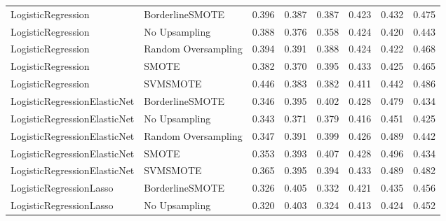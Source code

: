 \begin{tabular}{llllllll}
          LogisticRegression &     BorderlineSMOTE & 0.396 &                     0.387 &                 0.387 &                  0.423 &                                   0.432 &     0.475 \\
          LogisticRegression &       No Upsampling & 0.388 &                     0.376 &                 0.358 &                  0.424 &                                   0.420 &     0.443 \\
          LogisticRegression & Random Oversampling & 0.394 &                     0.391 &                 0.388 &                  0.424 &                                   0.422 &     0.468 \\
          LogisticRegression &               SMOTE & 0.382 &                     0.370 &                 0.395 &                  0.433 &                                   0.425 &     0.465 \\
          LogisticRegression &            SVMSMOTE & 0.446 &                     0.383 &                 0.382 &                  0.411 &                                   0.442 &     0.486 \\
LogisticRegressionElasticNet &     BorderlineSMOTE & 0.346 &                     0.395 &                 0.402 &                  0.428 &                                   0.479 &     0.434 \\
LogisticRegressionElasticNet &       No Upsampling & 0.343 &                     0.371 &                 0.379 &                  0.416 &                                   0.451 &     0.425 \\
LogisticRegressionElasticNet & Random Oversampling & 0.347 &                     0.391 &                 0.399 &                  0.426 &                                   0.489 &     0.442 \\
LogisticRegressionElasticNet &               SMOTE & 0.353 &                     0.393 &                 0.407 &                  0.428 &                                   0.496 &     0.434 \\
LogisticRegressionElasticNet &            SVMSMOTE & 0.365 &                     0.395 &                 0.394 &                  0.433 &                                   0.489 &     0.482 \\
     LogisticRegressionLasso &     BorderlineSMOTE & 0.326 &                     0.405 &                 0.332 &                  0.421 &                                   0.435 &     0.456 \\
     LogisticRegressionLasso &       No Upsampling & 0.320 &                     0.403 &                 0.324 &                  0.413 &                                   0.424 &     0.452 \\

\end{tabular}

